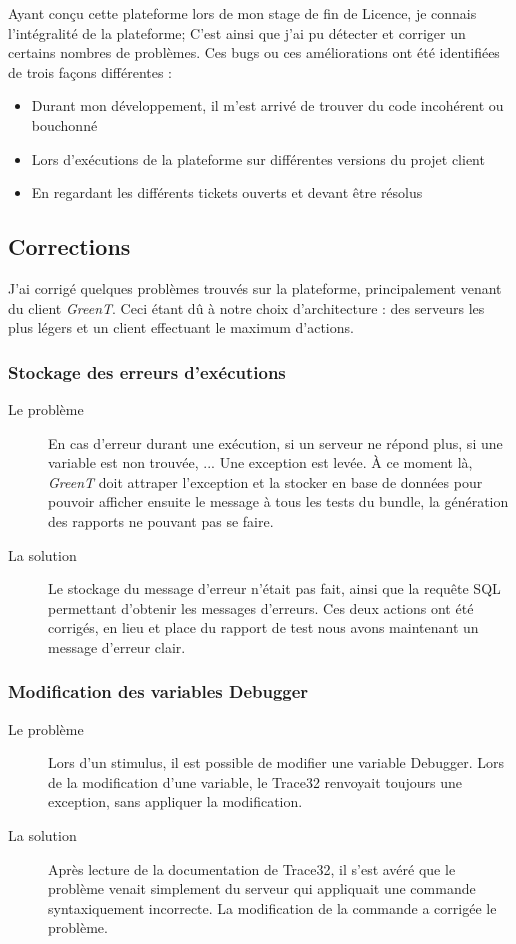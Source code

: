 Ayant conçu cette plateforme lors de mon stage de fin de Licence, je connais l'intégralité de la plateforme; C'est ainsi que j'ai pu détecter et corriger un certains nombres de problèmes. Ces bugs ou ces améliorations ont été identifiées de trois façons différentes : 
\begin{itemize}
	\item Durant mon développement, il m'est arrivé de trouver du code incohérent ou bouchonné
	\item Lors d'exécutions de la plateforme sur différentes versions du projet client
	\item En regardant les différents tickets ouverts et devant être résolus
\end{itemize}

\subsection{Corrections}
J'ai corrigé quelques problèmes trouvés sur la plateforme, principalement venant du client \textit{GreenT}. Ceci étant dû à notre choix d'architecture : des serveurs les plus légers et un client effectuant le maximum d'actions.
	\subsubsection{Stockage des erreurs d'exécutions}
	\begin{description}
		\item[Le problème] En cas d'erreur durant une exécution, si un serveur ne répond plus, si une variable est non trouvée, ... Une exception est levée. À ce moment là, \textit{GreenT} doit attraper l'exception et la stocker en base de données pour pouvoir afficher ensuite le message à tous les tests du bundle, la génération des rapports ne pouvant pas se faire.
		\item[La solution] Le stockage du message d'erreur n'était pas fait, ainsi que la requête SQL permettant d'obtenir les messages d'erreurs. Ces deux actions ont été corrigés, en lieu et place du rapport de test nous avons maintenant un message d'erreur clair.
		\end{description}
		
	\subsubsection{Modification des variables Debugger}
		\begin{description}
			\item[Le problème] Lors d'un stimulus, il est possible de modifier une variable Debugger. Lors de la modification d'une variable, le Trace32 renvoyait toujours une exception, sans appliquer la modification.
			\item[La solution] Après lecture de la documentation de Trace32, il s'est avéré que le problème venait simplement du serveur qui appliquait une commande syntaxiquement incorrecte. La modification de la commande a corrigée le problème.
	\end{description}
	
